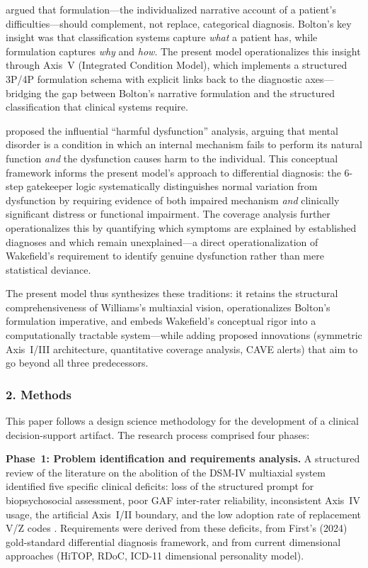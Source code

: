 \documentclass[11pt,a4paper]{article}
\begin{document}
\citet{Bolton2008} argued that formulation---the individualized narrative account of a patient's difficulties---should complement, not replace, categorical diagnosis. Bolton's key insight was that classification systems capture \textit{what} a patient has, while formulation captures \textit{why} and \textit{how}. The present model operationalizes this insight through Axis~V (Integrated Condition Model), which implements a structured 3P/4P formulation schema with explicit links back to the diagnostic axes---bridging the gap between Bolton's narrative formulation and the structured classification that clinical systems require.

\citet{Wakefield1992} proposed the influential ``harmful dysfunction'' analysis, arguing that mental disorder is a condition in which an internal mechanism fails to perform its natural function \textit{and} the dysfunction causes harm to the individual. This conceptual framework informs the present model's approach to differential diagnosis: the 6-step gatekeeper logic \citep{First2024} systematically distinguishes normal variation from dysfunction by requiring evidence of both impaired mechanism \textit{and} clinically significant distress or functional impairment. The coverage analysis further operationalizes this by quantifying which symptoms are explained by established diagnoses and which remain unexplained---a direct operationalization of Wakefield's requirement to identify genuine dysfunction rather than mere statistical deviance.

The present model thus synthesizes these traditions: it retains the structural comprehensiveness of Williams's multiaxial vision, operationalizes Bolton's formulation imperative, and embeds Wakefield's conceptual rigor into a computationally tractable system---while adding proposed innovations (symmetric Axis~I/III architecture, quantitative coverage analysis, CAVE alerts) that aim to go beyond all three predecessors.

\subsubsection*{2. Methods}

This paper follows a design science methodology for the development of a clinical decision-support artifact. The research process comprised four phases:

\textbf{Phase~1: Problem identification and requirements analysis.} A structured review of the literature on the abolition of the DSM-IV multiaxial system identified five specific clinical deficits: loss of the structured prompt for biopsychosocial assessment, poor GAF inter-rater reliability, inconsistent Axis~IV usage, the artificial Axis~I/II boundary, and the low adoption rate of replacement V/Z codes \citep{APA2013, Kress2014, Probst2014, ErlichFirst2025}. Requirements were derived from these deficits, from First's (2024) gold-standard differential diagnosis framework, and from current dimensional approaches (HiTOP, RDoC, ICD-11 dimensional personality model).
\end{document}
